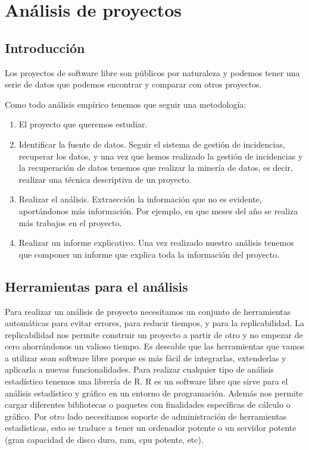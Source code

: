 \chapter{An\'alisis de proyectos}
\label{CHAP6:Analysis}
\section{Introducci\'on}
Los proyectos de software libre son p\'ublicos por naturaleza y podemos tener una serie de datos que podemos encontrar y comparar con otros proyectos.

Como todo an\'alisis emp\'irico tenemos que seguir una metodolog\'ia:
\begin{enumerate}
\item
El proyecto que queremos estudiar.
\item     
Identificar la fuente de datos. Seguir el sistema de gesti\'on de incidencias, recuperar los datos, y una vez que hemos realizado la gesti\'on de incidencias y la recuperaci\'on de datos tenemos que realizar la miner\'ia de datos, es decir, realizar una t\'ecnica descriptiva de un proyecto.
\item
Realizar el an\'alisis. Extraecci\'on la informaci\'on que no es evidente, aport\'andonos m\'as informaci\'on. Por ejemplo, en que meses del a\~no se realiza m\'as trabajos en el proyecto.
\item
Realizar un informe explicativo. Una vez realizado nuestro an\'alisis tenemos que componer un informe que explica toda la informaci\'on del proyecto.
\end{enumerate}

\section{Herramientas para el an\'alisis}
Para realizar un an\'alisis de proyecto necesitamos un conjunto de herramientas autom\'aticas para evitar errores, para reducir tiempos, y para la replicabilidad. La replicabilidad nos permite construir un proyecto a partir de otro y no empezar de cero ahorr\'andonos un valioso tiempo. 
Es deseable que las herramientas que vamos a utilizar sean software libre porque es m\'as f\'acil de integrarlas, extenderlas y aplicarla a nuevas funcionalidades. 
Para realizar cualquier tipo de an\'alisis estad\'istico tenemos una librer\'ia de R. R es un software libre que sirve para el análisis estad\'istico y gr\'afico en un entorno de programaci\'on. Adem\'as nos permite cargar diferentes bibliotecas o paquetes con finalidades espec\'ificas de c\'alculo o gr\'afico. 
Por otro lado necesitamos soporte de administraci\'on de herramientas estad\'isticas, esto se traduce a tener un ordenador potente o un servidor potente (gran capacidad de disco duro, ram, cpu potente, etc).

